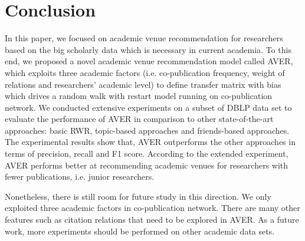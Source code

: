 \documentclass[9pt]{acm_proc_article-sp}
\begin{document}
\section{Conclusion}
In this paper, we focused on academic venue recommendation for researchers based on the big scholarly data which is necessary in current academia. To this end, we proposed a novel academic venue recommendation model called AVER, which exploits three academic factors (i.e. co-publication frequency, weight of relations and researchers' academic level) to define transfer matrix with bias which drives a random walk with restart model running on co-publication network. We conducted extensive experiments on a subset of DBLP data set to evaluate the performance of AVER in comparison to other state-of-the-art approaches: basic RWR, topic-based approaches and friends-based approaches. The experimental results show that, AVER outperforms the other approaches in terms of precision, recall and F1 score. According to the extended experiment, AVER performs better at recommending academic venues for researchers with fewer publications, i.e. junior researchers.

Nonetheless, there is still room for future study in this direction. We only exploited three academic factors in co-publication network. There are many other features such as citation relations that need to be explored in AVER. As a future work, more experiments should be performed on other academic data sets.





\balancecolumns
\end{document}
